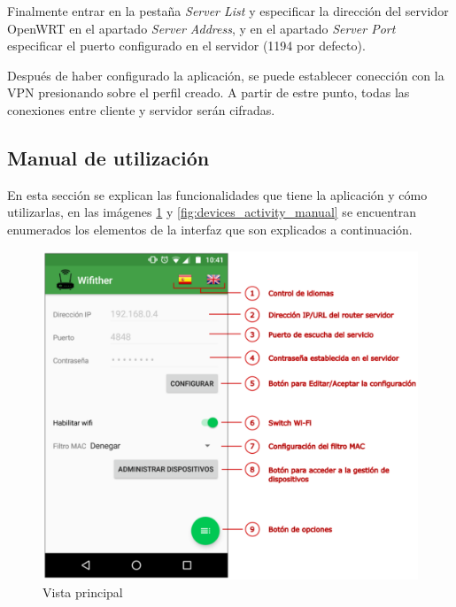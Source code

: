 \documentclass[12pt]{article}
\begin{document}
\begin{enumerate}
                Finalmente entrar en la pestaña \textit{Server List} y especificar la dirección del servidor OpenWRT en el apartado \textit{Server Address}, y en el apartado \textit{Server Port} especificar el puerto configurado en el servidor (1194 por defecto).

                Después de haber configurado la aplicación, se puede establecer conección con la VPN presionando sobre el perfil creado. A partir de estre punto, todas las conexiones entre cliente y servidor serán cifradas.
            \end{enumerate}

    \subsection{Manual de utilización}
        En esta sección se explican las funcionalidades que tiene la aplicación y cómo utilizarlas, en las imágenes \ref{fig:main_activity_manual} y \ref{fig:devices_activity_manual} se encuentran enumerados los elementos de la interfaz que son explicados a continuación.

        \begin{figure}[h!]
            \centering
                \includegraphics[scale=0.5]{main_activity_manual.eps}
                \caption*{Vista principal}
                \label{fig:main_activity_manual}
        \end{figure}
\end{document}
